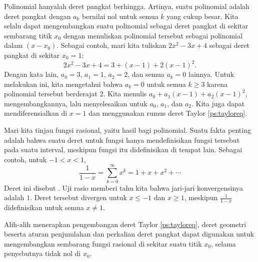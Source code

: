 Polinomial hanyalah deret pangkat berhingga. Artinya, suatu polinomial
adalah deret pangkat dengan
$a_k$ bernilai nol untuk semua $k$ yang cukup besar. Kita selalu dapat mengembangkan
suatu polinomial sebagai deret pangkat di sekitar sembarang titik $x_0$ dengan menuliskan
polinomial tersebut sebagai polinomial dalam $(x-x_0)$. Sebagai contoh,
mari kita tuliskan
$2x^2-3x+4$ sebagai deret pangkat di sekitar $x_0 = 1$:
\begin{equation*}
2x^2-3x+4 = 3 + (x-1) + 2{(x-1)}^2 .
\end{equation*}
Dengan kata lain, $a_0 = 3$, $a_1 = 1$, $a_2 = 2$, dan semua
$a_k = 0$ lainnya. Untuk melakukan ini, kita mengetahui bahwa $a_k = 0$ untuk semua $k \geq 3$ karena
polinomial tersebut berderajat 2.
Kita menulis $a_0 + a_1(x-1) + a_2{(x-1)}^2$, mengembangkannya, lalu menyelesaikan
untuk $a_0$, $a_1$, dan $a_2$. Kita juga dapat mendiferensialkan di $x=1$
dan menggunakan rumus deret Taylor \eqref{ps:tayloreq}.

Mari kita tinjau fungsi rasional, yaitu hasil bagi polinomial.
Suatu fakta penting adalah 
bahwa suatu deret untuk fungsi hanya mendefinisikan fungsi tersebut
pada suatu interval, meskipun fungsi itu didefinisikan di tempat lain. Sebagai contoh, untuk
$-1 < x < 1$,
\begin{equation*}
\frac{1}{1-x} =
\sum_{k=0}^\infty x^k =
1 + x + x^2 + \cdots
\end{equation*}
Deret ini disebut \emph{}. Uji rasio
memberi tahu kita bahwa jari-jari konvergensinya adalah $1$. Deret tersebut
divergen untuk $x \leq -1$ dan $x \geq 1$, meskipun
$\frac{1}{1-x}$ didefinisikan untuk semua $x \neq 1$.

Alih-alih menerapkan
pengembangan deret Taylor \eqref{ps:tayloreq},
deret geometri beserta aturan penjumlahan dan
perkalian deret pangkat dapat digunakan untuk mengembangkan sembarang fungsi rasional di sekitar
suatu titik $x_0$, selama penyebutnya tidak nol di $x_0$.

